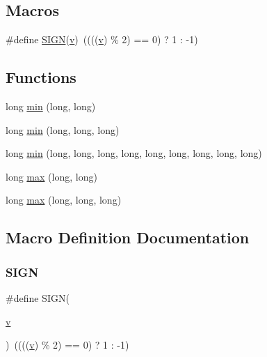 \subsection*{Macros}
\begin{DoxyCompactItemize}
\item 
\#define \mbox{\hyperlink{adat-devel_2lib_2SU3_2SU3__internal_8h_a4968ab13bee04e4ed9f7d7fe9b949c94}{S\+I\+GN}}(\mbox{\hyperlink{adat__devel_2lib_2hadron_2hadron__timeslice_8cc_a716fc87f5e814be3ceee2405ed6ff22a}{v}})~((((\mbox{\hyperlink{adat__devel_2lib_2hadron_2hadron__timeslice_8cc_a716fc87f5e814be3ceee2405ed6ff22a}{v}}) \% 2) == 0) ? 1 \+: -\/1)
\end{DoxyCompactItemize}
\subsection*{Functions}
\begin{DoxyCompactItemize}
\item 
long \mbox{\hyperlink{adat-devel_2lib_2SU3_2SU3__internal_8h_a04318caabb1b10526b80abe98f513aa1}{min}} (long, long)
\item 
long \mbox{\hyperlink{adat-devel_2lib_2SU3_2SU3__internal_8h_a70ba16c38d0b4d794bfcd594b5293b98}{min}} (long, long, long)
\item 
long \mbox{\hyperlink{adat-devel_2lib_2SU3_2SU3__internal_8h_ab0f5fed3171eb00d1c5f037d9f518a23}{min}} (long, long, long, long, long, long, long, long, long)
\item 
long \mbox{\hyperlink{adat-devel_2lib_2SU3_2SU3__internal_8h_aa46d99c835ece03e48b683c1a1410620}{max}} (long, long)
\item 
long \mbox{\hyperlink{adat-devel_2lib_2SU3_2SU3__internal_8h_ace7f45ceb252a2dfbf29b98bc81cb8ba}{max}} (long, long, long)
\end{DoxyCompactItemize}


\subsection{Macro Definition Documentation}
\mbox{\label{adat-devel_2lib_2SU3_2SU3__internal_8h_a4968ab13bee04e4ed9f7d7fe9b949c94}} 
\subsubsection{\texorpdfstring{SIGN}{SIGN}}
{\footnotesize\ttfamily \#define S\+I\+GN(\begin{DoxyParamCaption}\item[{}]{\mbox{\hyperlink{adat__devel_2lib_2hadron_2hadron__timeslice_8cc_a716fc87f5e814be3ceee2405ed6ff22a}{v}} }\end{DoxyParamCaption})~((((\mbox{\hyperlink{adat__devel_2lib_2hadron_2hadron__timeslice_8cc_a716fc87f5e814be3ceee2405ed6ff22a}{v}}) \% 2) == 0) ? 1 \+: -\/1)}



